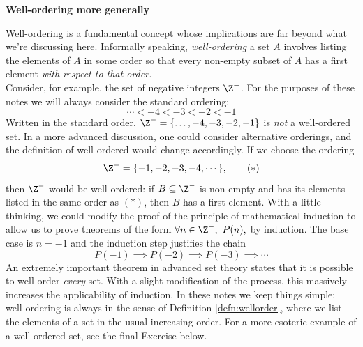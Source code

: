 \begin{aside}{}{}
	{\bf Well-ordering more generally}
	
	Well-ordering is a fundamental concept whose implications are far beyond what we're discussing here. Informally speaking, \emph{well-ordering} a set $A$ involves listing the elements of $A$ in some order so that every non-empty subset of $A$ has a first element \emph{with respect to that order.}\\
	Consider, for example, the set of negative integers $\Z^-$. For the purposes of these notes we will always consider the standard ordering:
	\[
		\cdots<-4<-3<-2<-1
	\]
	Written in the standard order, $\Z^-=\{\ldots,-4,-3,-2,-1\}$ is \emph{not} a well-ordered set. In a more advanced discussion, one could consider alternative orderings, and the definition of well-ordered would change accordingly. If we choose the ordering
	\[
		\Z^-=\{-1,-2,-3,-4,\cdots\},\tag{$\ast$}
	\]
	then $\Z^-$ would be well-ordered: if $B\subseteq\Z^-$ is non-empty and has its elements listed in the same order as $(\ast)$, then $B$ has a first element. With a little thinking, we could modify the proof of the principle of mathematical induction to allow us to prove theorems of the form $\forall n\in\Z^-,\ P(n),$ by induction. The base case is $n=-1$ and the induction step justifies the chain
	\[
		P(-1)\implies P(-2)\implies P(-3)\implies\cdots
	\]
	An extremely important theorem in advanced set theory states that it is possible to well-order \emph{every} set. With a slight modification of the process, this massively increases the applicability of induction. In these notes we keep things simple: well-ordering is always in the sense of Definition \ref{defn:wellorder}, where we list the elements of a set in the usual increasing order. For a more esoteric example of a well-ordered set, see the final Exercise below.
\end{aside}

% 

